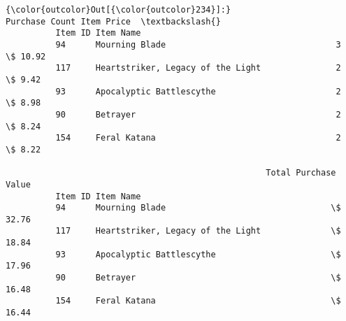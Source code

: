 \documentclass[11pt]{article}
\begin{document}
\begin{Verbatim}[commandchars=\\\{\}]
{\color{outcolor}Out[{\color{outcolor}234}]:}                                            Purchase Count Item Price  \textbackslash{}
          Item ID Item Name                                                      
          94      Mourning Blade                                  3    \$ 10.92   
          117     Heartstriker, Legacy of the Light               2     \$ 9.42   
          93      Apocalyptic Battlescythe                        2     \$ 8.98   
          90      Betrayer                                        2     \$ 8.24   
          154     Feral Katana                                    2     \$ 8.22   
          
                                                    Total Purchase Value  
          Item ID Item Name                                               
          94      Mourning Blade                                 \$ 32.76  
          117     Heartstriker, Legacy of the Light              \$ 18.84  
          93      Apocalyptic Battlescythe                       \$ 17.96  
          90      Betrayer                                       \$ 16.48  
          154     Feral Katana                                   \$ 16.44  
\end{Verbatim}
            

    
    
    
    
\end{document}
